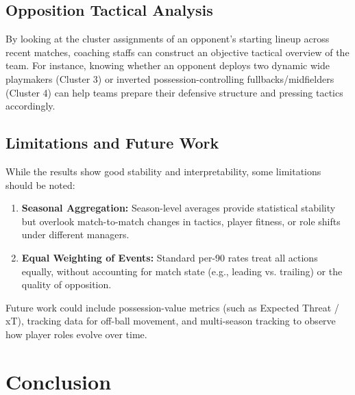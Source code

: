 \documentclass[12pt]{ai_conquer2026}
\begin{document}
\subsection{Opposition Tactical Analysis}
By looking at the cluster assignments of an opponent's starting lineup across recent matches, coaching staffs can construct an objective tactical overview of the team. For instance, knowing whether an opponent deploys two dynamic wide playmakers (Cluster 3) or inverted possession-controlling fullbacks/midfielders (Cluster 4) can help teams prepare their defensive structure and pressing tactics accordingly.

\subsection{Limitations and Future Work}
While the results show good stability and interpretability, some limitations should be noted:
\begin{enumerate}
  \item \textbf{Seasonal Aggregation:} Season-level averages provide statistical stability but overlook match-to-match changes in tactics, player fitness, or role shifts under different managers.
  \item \textbf{Equal Weighting of Events:} Standard per-90 rates treat all actions equally, without accounting for match state (e.g., leading vs. trailing) or the quality of opposition.
\end{enumerate}
Future work could include possession-value metrics (such as Expected Threat / xT), tracking data for off-ball movement, and multi-season tracking to observe how player roles evolve over time.

\section{Conclusion}
\label{sec:conclusion}
\end{document}
